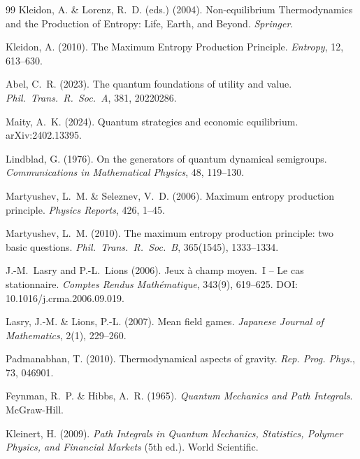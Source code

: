 \documentclass[12pt,a4paper]{article}
\theoremstyle{remark}
\begin{document}
\begin{thebibliography}{99}
Kleidon, A. \& Lorenz, R.~D. (eds.) (2004).
\newblock Non-equilibrium Thermodynamics and the Production of Entropy: Life, Earth, and Beyond.
\newblock \textit{Springer}.

Kleidon, A. (2010).
\newblock The Maximum Entropy Production Principle.
\newblock \textit{Entropy}, 12, 613--630.

Abel, C.~R. (2023).
\newblock The quantum foundations of utility and value.
\newblock \textit{Phil.\ Trans.\ R.\ Soc.\ A}, 381, 20220286.

Maity, A.~K. (2024).
\newblock Quantum strategies and economic equilibrium.
\newblock arXiv:2402.13395.

Lindblad, G. (1976).
\newblock On the generators of quantum dynamical semigroups.
\newblock \textit{Communications in Mathematical Physics}, 48, 119--130.

Martyushev, L.~M. \& Seleznev, V.~D. (2006).
\newblock Maximum entropy production principle.
\newblock \textit{Physics Reports}, 426, 1--45.

Martyushev, L.~M. (2010).
\newblock The maximum entropy production principle: two basic questions.
\newblock \textit{Phil.\ Trans.\ R.\ Soc.\ B}, 365(1545), 1333--1334.

J.-M.~Lasry and P.-L.~Lions (2006).
\newblock Jeux \`a champ moyen.\ I -- Le cas stationnaire.
\newblock \textit{Comptes Rendus Math\'ematique}, 343(9), 619--625.
\newblock DOI: 10.1016/j.crma.2006.09.019.

Lasry, J.-M. \& Lions, P.-L. (2007).
\newblock Mean field games.
\newblock \textit{Japanese Journal of Mathematics}, 2(1), 229--260.

Padmanabhan, T. (2010).
\newblock Thermodynamical aspects of gravity.
\newblock \textit{Rep. Prog. Phys.}, 73, 046901.

Feynman, R.~P. \& Hibbs, A.~R. (1965).
\newblock \textit{Quantum Mechanics and Path Integrals}.
\newblock McGraw-Hill.

Kleinert, H. (2009).
\newblock \textit{Path Integrals in Quantum Mechanics, Statistics, Polymer Physics, and Financial Markets} (5th ed.).
\newblock World Scientific.


\end{thebibliography}
\end{document}
